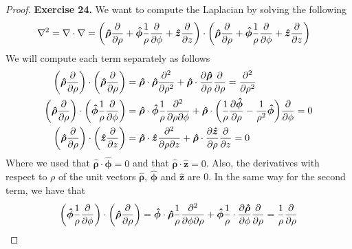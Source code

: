\documentclass[11pt]{article}
\newcommand{\hatz}{\bm{\hat{z}}}
\newcommand{\hatrho}{\bm{\hat{\rho}}}
\newcommand{\hatphi}{\bm{\hat{\phi}}}
\theoremstyle{definition}
\begin{document}
\cleardoublepage
\begin{proof}{\textbf{Exercise 24.}}
    We want to compute the Laplacian by solving the following
    \begin{align*}
        \laplacian &= \nabla \cdot \nabla = \bigg(
            \hatrho \partialderivative{}{\rho}
            + \hatphi \frac{1}{\rho}\partialderivative{}{\phi}
            + \hatz \partialderivative{}{z}
        \bigg) \cdot \bigg(
            \hatrho \partialderivative{}{\rho}
            + \hatphi \frac{1}{\rho}\partialderivative{}{\phi}
            + \hatz \partialderivative{}{z}
        \bigg)
    \end{align*}
    We will compute each term separately as follows
    \begin{align*}
        \bigg(\hatrho \partialderivative{}{\rho}\bigg)\cdot
        \bigg(\hatrho \partialderivative{}{\rho}\bigg)
        &= \hatrho \cdot \hatrho \partialderivative{^2}{\rho^2}
        + \hatrho \cdot \partialderivative{\hatrho}{\rho}
        \partialderivative{}{\rho}
        = \partialderivative{^2}{\rho^2}\\
        \bigg(\hatrho \partialderivative{}{\rho}\bigg)\cdot
        \bigg(\hatphi \frac{1}{\rho}\partialderivative{}{\phi}\bigg)
        &= \hatrho \cdot \hatphi \frac{1}{\rho}
        \partialderivative{^2}{\rho\partial\phi}
        + \hatrho \cdot \bigg(\frac{1}{\rho}\partialderivative{\hatphi}{\rho}
        - \frac{1}{\rho^2}\hatphi\bigg)
        \partialderivative{}{\phi}
        = 0\\
        \bigg(\hatrho \partialderivative{}{\rho}\bigg)\cdot
        \bigg(\hatz \partialderivative{}{z}\bigg)
        &= \hatrho \cdot \hatz \partialderivative{^2}{\rho\partial z}
        + \hatrho \cdot \partialderivative{\hatz}{\rho}
        \partialderivative{}{z}
        = 0
    \end{align*}
    Where we used that $\hatrho \cdot \hatphi = 0$ and that
    $\hatrho \cdot \hatz = 0$. Also, the derivatives with respect to $\rho$
    of the unit vectors $\hatrho$, $\hatphi$ and $\hatz$ are 0.
    In the same way for the second term, we have that
    \begin{align*}
        \bigg(\hatphi \frac{1}{\rho} \partialderivative{}{\phi}\bigg)\cdot
        \bigg(\hatrho \partialderivative{}{\rho}\bigg)
        &= \hatphi \cdot \hatrho \frac{1}{\rho}
        \partialderivative{^2}{\phi\partial\rho}
        + \hatphi\frac{1}{\rho} \cdot \partialderivative{\hatrho}{\phi}
        \partialderivative{}{\rho}
        = \frac{1}{\rho}\partialderivative{}{\rho}\\

\end{align*}
\end{proof}
\end{document}
